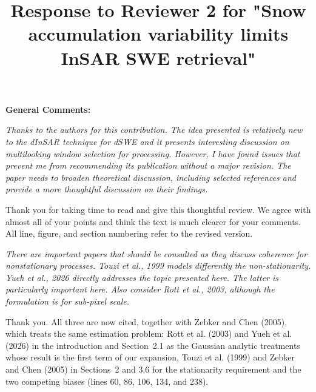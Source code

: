 \documentclass[tc, manuscript]{copernicus}
\begin{document}
\title{Response to Reviewer 2 for "Snow accumulation variability limits InSAR SWE retrieval"}






\maketitle

\textbf{General Comments:}

\textit{Thanks to the authors for this contribution. The idea presented is relatively new to the dInSAR
technique for dSWE and it presents interesting discussion on multilooking window selection
for processing. However, I have found issues that prevent me from recommending its
publication without a major revision. The paper needs to broaden theoretical discussion,
including selected references and provide a more thoughtful discussion on their findings.}

Thank you for taking time to read and give this thoughtful review. We agree with almost all of your points and think the text is much clearer for your comments. All line, figure, and section numbering refer to the revised version.

\textit{There are important papers that should be consulted as they discuss coherence for nonstationary processes. Touzi et al., 1999 models differently the non-stationarity. Yueh et al., 2026 directly addresses the topic presented here. The latter is particularly important here. Also consider Rott et al., 2003, although the formulation is for sub-pixel scale.} 

Thank you. All three are now cited, together with Zebker and Chen (2005), which treats the same estimation problem: Rott et al. (2003) and Yueh et al. (2026) in the introduction and Section~2.1 as the Gaussian analytic treatments whose result is the first term of our expansion, Touzi et al. (1999) and Zebker and Chen (2005) in Sections~2 and 3.6 for the stationarity requirement and the two competing biases (lines 60, 86, 106, 134, and 238).
\end{document}
